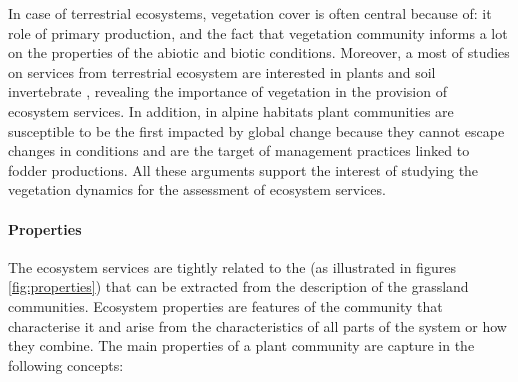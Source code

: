 In case of terrestrial ecosystems, vegetation cover is often central because of: it role of primary production, and the fact that vegetation community informs a lot on the properties of the abiotic and biotic conditions. Moreover, a most of studies on services from terrestrial ecosystem are interested in plants and soil invertebrate \cite{de_bello_towards_2010}, revealing the importance of vegetation in the provision of ecosystem services. In addition, in alpine habitats plant communities are susceptible to be the first impacted by global change because they cannot escape changes in conditions and are the target of management practices linked to fodder productions. All these arguments support the interest of studying the vegetation dynamics for the assessment of ecosystem services.


\paragraph{Properties}
The ecosystem services are tightly related to the  (as illustrated in figures \ref{fig:properties})\parencite{lavorel_predicting_2002, diaz_incorporating_2007} that can be extracted from the description of the grassland communities. Ecosystem properties are features of the community that characterise it and arise from the characteristics of all parts of  the system or how they combine. The main properties of a plant community are capture in the following concepts:
